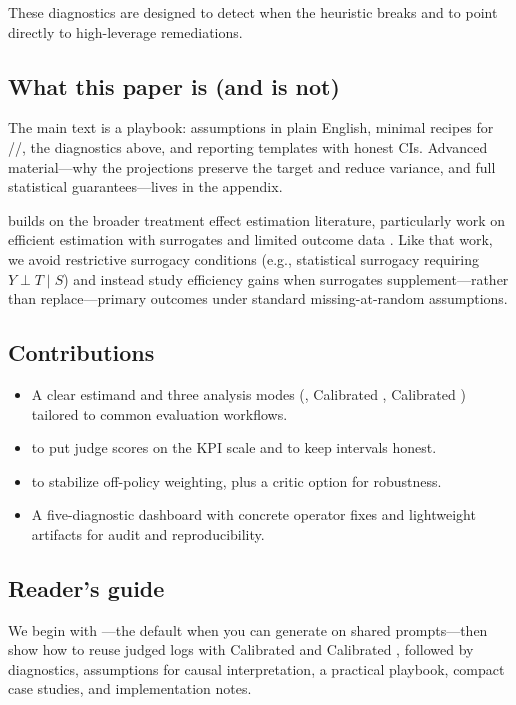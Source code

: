 These diagnostics are designed to detect when the heuristic breaks and to point directly to high-leverage remediations.

\subsection{What this paper is (and is not)}

The main text is a playbook: assumptions in plain English, minimal recipes for \dm/\ips/\dr, the diagnostics above, and reporting templates with honest CIs. Advanced material---why the projections preserve the target and reduce variance, and full statistical guarantees---lives in the appendix.

\cje{} builds on the broader treatment effect estimation literature, particularly work on efficient estimation with surrogates and limited outcome data \cite{kallus2024role}. Like that work, we avoid restrictive surrogacy conditions (e.g., statistical surrogacy requiring $Y \perp T \mid S$) and instead study efficiency gains when surrogates supplement---rather than replace---primary outcomes under standard missing-at-random assumptions.

\subsection{Contributions}

\begin{itemize}
\item A clear estimand and three analysis modes (\dm, Calibrated \ips, Calibrated \dr) tailored to common evaluation workflows.

\item \autocal{} to put judge scores on the KPI scale and \oua{} to keep intervals honest.

\item \simcal{} to stabilize off-policy weighting, plus a critic option for \dr{} robustness.

\item A five-diagnostic dashboard with concrete operator fixes and lightweight artifacts for audit and reproducibility.
\end{itemize}

\subsection{Reader's guide}

We begin with \dm---the default when you can generate on shared prompts---then show how to reuse judged logs with Calibrated \ips{} and Calibrated \dr, followed by diagnostics, assumptions for causal interpretation, a practical playbook, compact case studies, and implementation notes.
